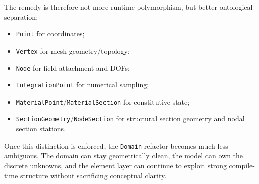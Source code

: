 The remedy is therefore not more runtime polymorphism, but better ontological
separation:

\begin{itemize}[nosep]
  \item \texttt{Point} for coordinates;
  \item \texttt{Vertex} for mesh geometry/topology;
  \item \texttt{Node} for field attachment and DOFs;
  \item \texttt{IntegrationPoint} for numerical sampling;
  \item \texttt{MaterialPoint}/\texttt{MaterialSection} for constitutive state;
  \item \texttt{SectionGeometry}/\texttt{NodeSection} for structural section
        geometry and nodal section stations.
\end{itemize}

Once this distinction is enforced, the \texttt{Domain} refactor becomes much
less ambiguous.  The domain can stay geometrically clean, the model can own the
discrete unknowns, and the element layer can continue to exploit strong
compile-time structure without sacrificing conceptual clarity.
